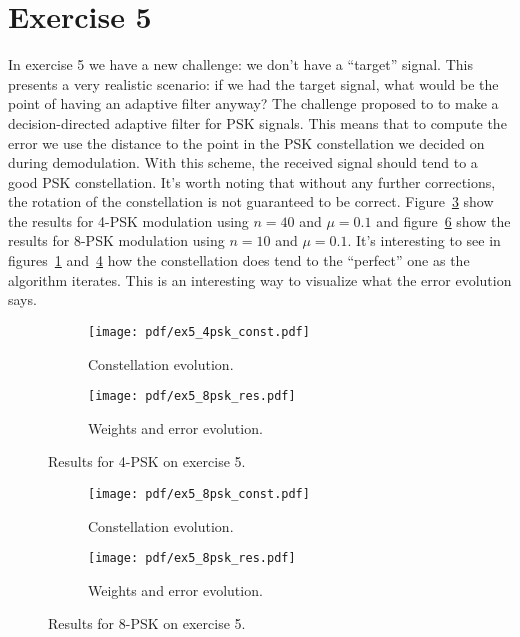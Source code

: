 \section{Exercise 5}

In exercise 5 we have a new challenge: we don't have a ``target'' signal. This
presents a very realistic scenario: if we had the target signal, what would be the
point of having an adaptive filter anyway? The challenge proposed to to make a
decision-directed adaptive filter for PSK signals. This means that to compute the
error we use the distance to the point in the PSK constellation we decided on
during demodulation. With this scheme, the received signal should tend to a good
PSK constellation. It's worth noting that without any further corrections, the
rotation of the constellation is not guaranteed to be correct.
Figure~\ref{fig:ex5_4psk} show the results for 4-PSK modulation using \(n=40\) and
\(\mu=0.1\) and figure~\ref{fig:ex5_8psk} show the results for 8-PSK modulation
using \(n=10\) and \(\mu=0.1\). It's interesting to see in
figures~\ref{fig:ex5_4psk_const} and~\ref{fig:ex5_8psk_const} how the
constellation does tend to the ``perfect'' one as the algorithm iterates. This is
an interesting way to visualize what the error evolution says.
\begin{figure}
    \centering
    \begin{subfigure}[t]{0.32\columnwidth}
        \centering
        \texttt{[image: pdf/ex5\_4psk\_const.pdf]}
        \caption{Constellation evolution.\label{fig:ex5_4psk_const}}
    \end{subfigure} \hspace{1cm}
    \begin{subfigure}[t]{0.32\columnwidth}
        \centering
        \texttt{[image: pdf/ex5\_8psk\_res.pdf]}
        \caption{Weights and error evolution.\label{fig:ex5_4psk_res}}
    \end{subfigure}
    \caption{Results for 4-PSK on exercise 5.\label{fig:ex5_4psk}}
\end{figure}

\begin{figure}
    \centering
    \begin{subfigure}[t]{0.32\columnwidth}
        \centering
        \texttt{[image: pdf/ex5\_8psk\_const.pdf]}
        \caption{Constellation evolution.\label{fig:ex5_8psk_const}}
    \end{subfigure} \hspace{1cm}
    \begin{subfigure}[t]{0.32\columnwidth}
        \centering
        \texttt{[image: pdf/ex5\_8psk\_res.pdf]}
        \caption{Weights and error evolution.\label{fig:ex5_8psk_res}}
    \end{subfigure}
    \caption{Results for 8-PSK on exercise 5.\label{fig:ex5_8psk}}
\end{figure}
